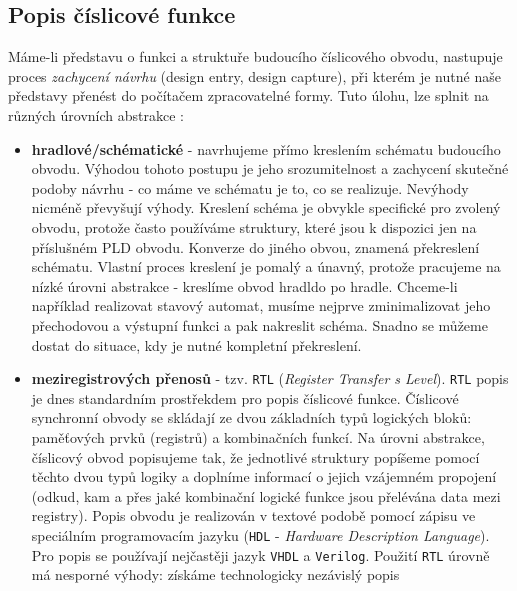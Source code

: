 {    \subsection{Popis číslicové funkce}
      Máme-li představu o funkci a struktuře budoucího číslicového obvodu, nastupuje proces 
      \emph{zachycení návrhu} (design entry, design capture), při kterém je nutné naše představy 
      přenést do počítačem zpracovatelné formy. Tuto úlohu, lze splnit na různých úrovních 
      abstrakce \cite[s.~19]{Stastny2010}:
      \begin{itemize}
        \item \textbf{hradlové/schématické} - navrhujeme přímo kreslením schématu budoucího 
              obvodu. Výhodou tohoto postupu je jeho srozumitelnost a zachycení skuteč\-né podoby 
              návrhu  - co máme ve schématu je to, co se realizuje. Nevýhody nicméně převyšují 
              výhody. Kreslení schéma je obvykle specifické pro zvolený obvodu, protože často 
              používáme struktury, které jsou k dispozici jen na příslušném PLD obvodu. Konverze do 
              jiného obvou, znamená překreslení schématu. Vlastní proces kreslení je pomalý a 
              únavný, protože pracujeme na nízké úrovni abstrakce - kreslíme obvod hradldo po 
              hradle. Chceme-li například realizovat stavový automat, musíme nejprve zminimalizovat 
              jeho přechodovou a výstupní funkci a pak nakreslit schéma. Snadno se můžeme dostat do 
              situace, kdy je nutné kompletní překreslení. 
        \item \textbf{meziregistrových přenosů} - tzv. \texttt{RTL} (\emph{Register Transfer  s  
              Level}). \texttt{RTL} popis je dnes standardním prostřekdem pro popis číslicové 
              funkce. Číslicové synchronní obvody se skládají ze dvou základních typů         
              logických bloků: pamě\-ťo\-vých prvků (registrů) a kombinačních funkcí. Na úrovni 
              abstrakce, číslicový obvod popisujeme tak, že jednotlivé struktury popíšeme pomocí 
              těchto dvou typů logiky a doplníme informací o jejich vzájemném propojení          
              (odkud, kam a přes jaké kombinační logické funkce jsou přelévána data mezi registry). 
              Popis obvodu je realizován v textové podobě pomocí zápisu ve speciálním 
              progra\-mo\-va\-cím jazyku (\texttt{HDL} - \emph{Hardware Description         
              Language}). Pro popis se používají nejčastěji jazyk \texttt{VHDL} a \texttt{Verilog}. 
              Použití \texttt{RTL} úrovně má nesporné výhody: získáme technologicky nezávislý popis 

\end{itemize}}
